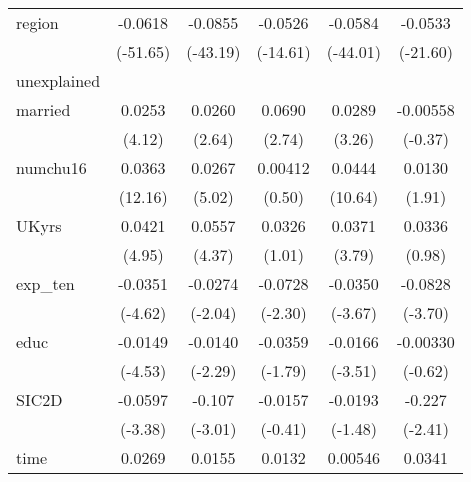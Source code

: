 \begin{table}[htbp]
\begin{tabular}{l*{5}{c}}
region      &     -0.0618\sym{***}&     -0.0855\sym{***}&     -0.0526\sym{***}&     -0.0584\sym{***}&     -0.0533\sym{***}\\
            &    (-51.65)         &    (-43.19)         &    (-14.61)         &    (-44.01)         &    (-21.60)         \\
\hline
unexplained &                     &                     &                     &                     &                     \\
married     &      0.0253\sym{***}&      0.0260\sym{**} &      0.0690\sym{**} &      0.0289\sym{**} &    -0.00558         \\
            &      (4.12)         &      (2.64)         &      (2.74)         &      (3.26)         &     (-0.37)         \\
numchu16    &      0.0363\sym{***}&      0.0267\sym{***}&     0.00412         &      0.0444\sym{***}&      0.0130         \\
            &     (12.16)         &      (5.02)         &      (0.50)         &     (10.64)         &      (1.91)         \\
UKyrs       &      0.0421\sym{***}&      0.0557\sym{***}&      0.0326         &      0.0371\sym{***}&      0.0336         \\
            &      (4.95)         &      (4.37)         &      (1.01)         &      (3.79)         &      (0.98)         \\
exp\_ten     &     -0.0351\sym{***}&     -0.0274\sym{*}  &     -0.0728\sym{*}  &     -0.0350\sym{***}&     -0.0828\sym{***}\\
            &     (-4.62)         &     (-2.04)         &     (-2.30)         &     (-3.67)         &     (-3.70)         \\
educ        &     -0.0149\sym{***}&     -0.0140\sym{*}  &     -0.0359         &     -0.0166\sym{***}&    -0.00330         \\
            &     (-4.53)         &     (-2.29)         &     (-1.79)         &     (-3.51)         &     (-0.62)         \\
SIC2D       &     -0.0597\sym{***}&      -0.107\sym{**} &     -0.0157         &     -0.0193         &      -0.227\sym{*}  \\
            &     (-3.38)         &     (-3.01)         &     (-0.41)         &     (-1.48)         &     (-2.41)         \\
time        &      0.0269\sym{***}&      0.0155         &      0.0132         &     0.00546         &      0.0341\sym{*}  \\

\end{tabular}
\end{table}
